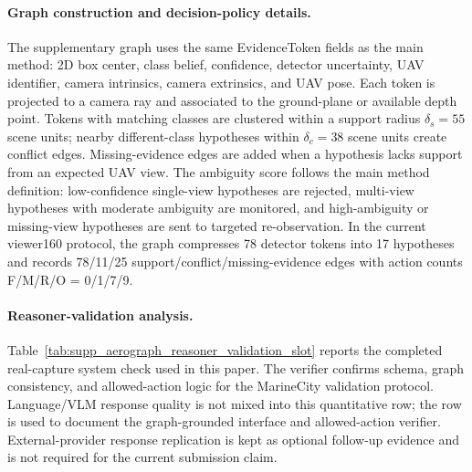 \paragraph{Graph construction and decision-policy details.}
The supplementary graph uses the same EvidenceToken fields as the main method:
2D box center, class belief, confidence, detector uncertainty, UAV identifier,
camera intrinsics, camera extrinsics, and UAV pose. Each token is projected to a
camera ray and associated to the ground-plane or available depth point. Tokens
with matching classes are clustered within a support radius
$\delta_s=55$ scene units; nearby different-class hypotheses within
$\delta_c=38$ scene units create conflict edges. Missing-evidence edges are
added when a hypothesis lacks support from an expected UAV view. The ambiguity
score follows the main method definition: low-confidence
single-view hypotheses are rejected, multi-view hypotheses with moderate
ambiguity are monitored, and high-ambiguity or missing-view hypotheses are sent
to targeted re-observation. In the current viewer160 protocol, the graph
compresses 78 detector tokens into 17 hypotheses and records 78/11/25
support/conflict/missing-evidence edges with action counts
F/M/R/O = 0/1/7/9.

\begin{table}[!htbp]
\centering
\scriptsize
\caption{AeroGraph Reasoner validation summary for the current paper.
The table reports the completed real-capture system check and verifier-controlled
action schema used by the current paper.}
\label{tab:supp_aerograph_reasoner_validation_slot}

\end{table}

\paragraph{Reasoner-validation analysis.}
Table~\ref{tab:supp_aerograph_reasoner_validation_slot} reports the completed
real-capture system check used in this paper. The verifier confirms schema,
graph consistency, and allowed-action logic for the MarineCity validation protocol.
Language/VLM response quality is not mixed into this quantitative row; the row
is used to document the graph-grounded interface and allowed-action verifier.
External-provider response replication is kept as optional follow-up evidence
and is not required for the current submission claim.

\begin{table}[!htbp]
\centering
\scriptsize
\setlength{\tabcolsep}{3pt}
\caption{Auxiliary MarineCity Nerfacto iteration and capture sweep. The bold
full-resolution 24k row is the representative Nerfacto validation metric used
by the main paper. Longer or alternate capture runs are kept here to show that
additional iterations do not automatically improve the sparse real-Cesium
held-out split.}
\label{tab:supp_marinecity_nerfacto_sweep}
\begin{center}

\end{center}
\end{table}

